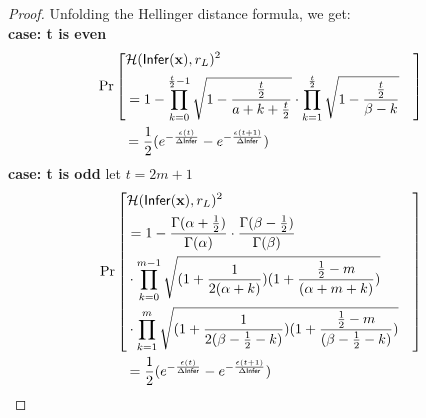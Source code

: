 \documentclass{article}
\begin{document}
\begin{proof}
Unfolding the Hellinger distance formula, we get:\\
  \noindent \textbf{case: t is even}
  \begin{align*}
  &\Pr\left[
\begin{aligned}\lefteqn{\hellinger(\bysinfer(\dataobs), r_L )^2}\\
&= 1 - \prod_{k = 0}^{\frac{t}{2} - 1}
  \sqrt{1 - \frac{\frac{t}{2}}{a + k + \frac{t}{2}}}
  \cdot\prod_{k = 1}^{\frac{t}{2}}
  \sqrt{1 - \frac{\frac{t}{2}}{\beta - k}}
\end{aligned}
\right] \\
  &\qquad = \frac{1}{2} (e^{- \frac{\epsilon (t)}{\Delta \bysinfer}} - e^{- \frac{\epsilon (t + 1)}{\Delta \bysinfer}})
  \end{align*}
  \noindent \textbf{case: t is odd}
  let $t = 2 m + 1$
  \begin{align*}
  & \Pr\left[
  \begin{aligned}\lefteqn{\hellinger(\bysinfer(\dataobs), r_L )^2} \\
  & =
  1 - \frac{\Gamma(\alpha+\frac{1}{2})}{\Gamma(\alpha)} \cdot
\frac{\Gamma(\beta - \frac{1}{2})}{\Gamma(\beta)}\\
&\cdot 
  \prod_{k = 0}^{m-1}
  \sqrt{(1 + \frac{1}{2(\alpha + k)})
  (1 + \frac{\frac{1}{2} - m}{(\alpha + m  + k)})
  }\\ &\cdot 
  \prod_{k = 1}^{m} 
  \sqrt{(1 + \frac{1}{2(\beta - \frac{1}{2}- k)})(1 + \frac{\frac{1}{2} - m}{(\beta - \frac{1}{2}- k)})} \end{aligned}
\right] \\
   &\qquad = \frac{1}{2} (e^{- \frac{\epsilon (t)}{\Delta \bysinfer}} - e^{- \frac{\epsilon (t + 1)}{\Delta \bysinfer}})
  \end{align*}

\end{proof}
\end{document}
